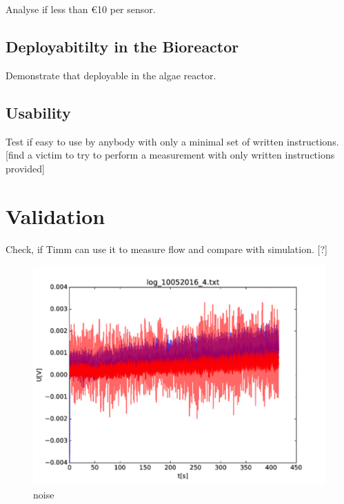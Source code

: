 Analyse if less than \euro{10} per sensor.

\subsection{Deployabitilty in the Bioreactor}

Demonstrate that deployable in the algae reactor.

\subsection{Usability}

Test if easy to use by anybody with only a minimal set of written instructions. [find a victim to try to perform a measurement with only written instructions provided]

\section{Validation}

Check, if Timm can use it to measure flow and compare with simulation. [?]

\begin{figure}
	\begin{center}
		\includegraphics[width=\textwidth]{images/noise.pdf} 
		\caption{noise}
	\end{center}
\end{figure}

